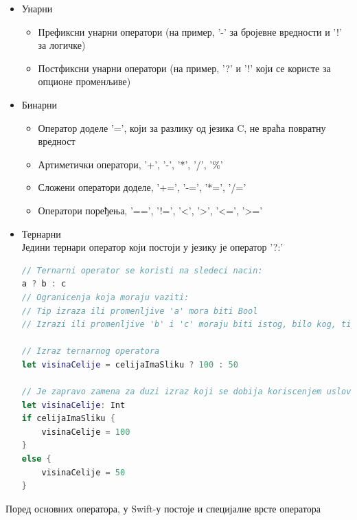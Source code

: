 \documentclass[12pt,oneside]{memoir}
\begin{document}
\begin{itemize}
  \item Унарни
  
\begin{itemize}
    \item Префиксни унарни оператори (на пример, '-' за бројевне вредности и '!' за логичке)  
    \item Постфиксни унарни оператори (на пример, '?' и '!' који се користе за опционе променљиве)
\end{itemize}
  
  \item Бинарни 
  
\begin{itemize}
    \item Оператор доделе '=', који за разлику од језика C, не враћа повратну вредност  
    \item Артиметички оператори, '+', '-', '*', '/', '\%'
    \item Сложени оператори доделе, '+=', '-=', '*=', '/='
    \item Оператори поређења, '==', '!=', '<', '>', '<=', '>='
\end{itemize}
 
  \item Тернарни \\
  Једини тернари оператор који постоји у језику је оператор '?:'
  
\begin{lstlisting}[caption=\textit{{Тернарни оператор}}, label={lst:Тернарни оператор}, language=Swift, frame=single]
// Ternarni operator se koristi na sledeci nacin:
a ? b : c
// Ogranicenja koja moraju vaziti:
// Tip izraza ili promenljive 'a' mora biti Bool
// Izrazi ili promenljive 'b' i 'c' moraju biti istog, bilo kog, tipa

// Izraz ternarnog operatora 
let visinaCelije = celijaImaSliku ? 100 : 50

// Je zapravo zamena za duzi izraz koji se dobija koriscenjem uslovnog grananja
let visinaCelije: Int
if celijaImaSliku {
    visinaCelije = 100
}
else {
    visinaCelije = 50
}
\end{lstlisting}
\end{itemize}

\indent Поред основних оператора, у Swift-у постоје и специјалне врсте оператора
\end{document}
